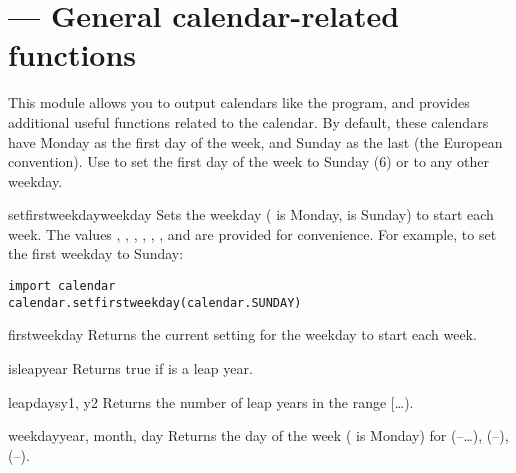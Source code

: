\section{ ---
         General calendar-related functions}


This module allows you to output calendars like the \UNIX{}
 program, and provides additional useful functions
related to the calendar. By default, these calendars have Monday as
the first day of the week, and Sunday as the last (the European
convention). Use  to set the first day of the
week to Sunday (6) or to any other weekday.

\begin{funcdesc}{setfirstweekday}{weekday}
Sets the weekday ( is Monday,  is Sunday) to start
each week. The values , ,
, , ,
, and  are provided for
convenience. For example, to set the first weekday to Sunday:

\begin{verbatim}
import calendar
calendar.setfirstweekday(calendar.SUNDAY)
\end{verbatim}
\end{funcdesc}

\begin{funcdesc}{firstweekday}{}
Returns the current setting for the weekday to start each week.
\end{funcdesc}

\begin{funcdesc}{isleap}{year}
Returns true if  is a leap year.
\end{funcdesc}

\begin{funcdesc}{leapdays}{y1, y2}
Returns the number of leap years in the range
[\ldots{}).
\end{funcdesc}

\begin{funcdesc}{weekday}{year, month, day}
Returns the day of the week ( is Monday) for 
(--\ldots),  (--), 
(--).
\end{funcdesc}

